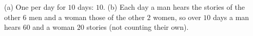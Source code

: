 (a) One per day for $10$ days: $\boxed{10}$. (b) Each day a man hears the stories of the other $6$ men and a woman those of the other $2$ women, so over $10$ days a man hears $\boxed{60}$ and a woman $\boxed{20}$ stories (not counting their own).

